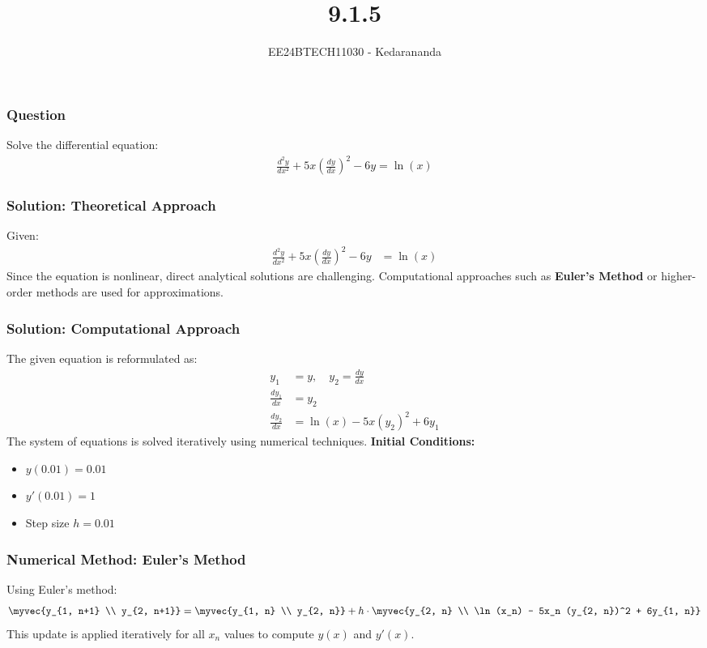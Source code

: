 \documentclass{beamer}
\title{9.1.5}
\author{EE24BTECH11030 - Kedarananda}
\date{}
\begin{document}
\frame{\titlepage}

\begin{frame}
\frametitle{Question}
Solve the differential equation:
\begin{align*}
    \frac{d^2y}{dx^2} + 5x \left( \frac{dy}{dx} \right)^2 - 6y = \ln(x)
\end{align*}
\end{frame}

\begin{frame}
\frametitle{Solution: Theoretical Approach}
Given:
\begin{align}
    \frac{d^2y}{dx^2} + 5x \left( \frac{dy}{dx} \right)^2 - 6y &= \ln(x)
\end{align}
\newline
Since the equation is nonlinear, direct analytical solutions are challenging. Computational approaches such as \textbf{Euler's Method} or higher-order methods are used for approximations.
\end{frame}

\begin{frame}
\frametitle{Solution: Computational Approach}
The given equation is reformulated as:
\begin{align}
    y_1 &= y, \quad y_2 = \frac{dy}{dx} \\
    \frac{dy_1}{dx} &= y_2 \\
    \frac{dy_2}{dx} &= \ln(x) - 5x(y_2)^2 + 6y_1
\end{align}
The system of equations is solved iteratively using numerical techniques.
\newline
\textbf{Initial Conditions:}
\begin{itemize}
    \item $y(0.01) = 0.01$
    \item $y'(0.01) = 1$
    \item Step size $h = 0.01$
\end{itemize}
\end{frame}

\begin{frame}
\frametitle{Numerical Method: Euler's Method}
Using Euler's method:
\begin{align}
    \myvec{y_{1, n+1} \\ y_{2, n+1}} = \myvec{y_{1, n} \\ y_{2, n}} 
    + h \cdot \myvec{y_{2, n} \\ \ln(x_n) - 5x_n (y_{2, n})^2 + 6y_{1, n}}
\end{align}
This update is applied iteratively for all $x_n$ values to compute $y(x)$ and $y'(x)$.
\end{frame}
\end{document}

